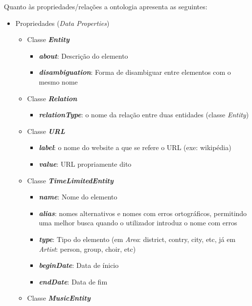 \documentclass{article}
\begin{document}
Quanto às propriedades/relações a ontologia apresenta as seguintes:
\begin{itemize}
    \item Propriedades (\textit{Data Properties})
    \begin{itemize}
        \item Classe \textbf{\textit{Entity}}
        \begin{itemize}
            \item \textbf{\textit{about}}: Descrição do elemento
            \item \textbf{\textit{disambiguation}}: Forma de disambiguar entre elementos com o mesmo nome
        \end{itemize}
        \item Classe \textbf{\textit{Relation}}
        \begin{itemize}
            \item \textbf{\textit{relationType}}: o nome da relação entre duas entidades (classe \textit{Entity})
        \end{itemize}
        \item Classe \textbf{\textit{URL}}
        \begin{itemize}
            \item \textbf{\textit{label}}: o nome do website a que se refere o URL (exe: wikipédia)
            \item \textbf{\textit{value}}: URL propriamente dito
        \end{itemize}
        \item Classe \textbf{\textit{TimeLimitedEntity}}
        \begin{itemize}
            \item \textbf{\textit{name}}: Nome do elemento
            \item \textbf{\textit{alias}}: nomes alternativos e nomes com erros ortográficos, permitindo uma melhor busca quando o utilizador introduz o nome com erros 
            \item \textbf{\textit{type}}: Tipo do elemento (em \textit{Area}: district, contry, city, etc, já em \textit{Artist}: person, group, choir, etc)
            \item \textbf{\textit{beginDate}}: Data de ínicio
            \item \textbf{\textit{endDate}}: Data de fim
        \end{itemize}
        \item Classe \textbf{\textit{MusicEntity}}
        \begin{itemize}

\end{itemize}
\end{itemize}
\end{itemize}
\end{document}
